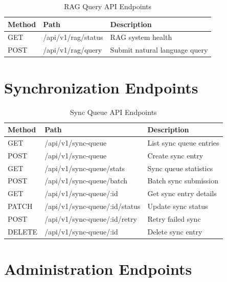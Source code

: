 \begin{longtable}{lll}
\caption{RAG Query API Endpoints}
\label{tab:rag-api} \\
\toprule
\textbf{Method} & \textbf{Path} & \textbf{Description} \\
\midrule
\endhead
\midrule
\endfoot
\bottomrule
\endlastfoot
GET & /api/v1/rag/status & RAG system health \\
POST & /api/v1/rag/query & Submit natural language query \\
\end{longtable}

\section{Synchronization Endpoints}

\begin{longtable}{lll}
\caption{Sync Queue API Endpoints}
\label{tab:sync-api} \\
\toprule
\textbf{Method} & \textbf{Path} & \textbf{Description} \\
\midrule
\endhead
\midrule
\endfoot
\bottomrule
\endlastfoot
GET & /api/v1/sync-queue & List sync queue entries \\
POST & /api/v1/sync-queue & Create sync entry \\
GET & /api/v1/sync-queue/stats & Sync queue statistics \\
POST & /api/v1/sync-queue/batch & Batch sync submission \\
GET & /api/v1/sync-queue/:id & Get sync entry details \\
PATCH & /api/v1/sync-queue/:id/status & Update sync status \\
POST & /api/v1/sync-queue/:id/retry & Retry failed sync \\
DELETE & /api/v1/sync-queue/:id & Delete sync entry \\
\end{longtable}

\section{Administration Endpoints}

